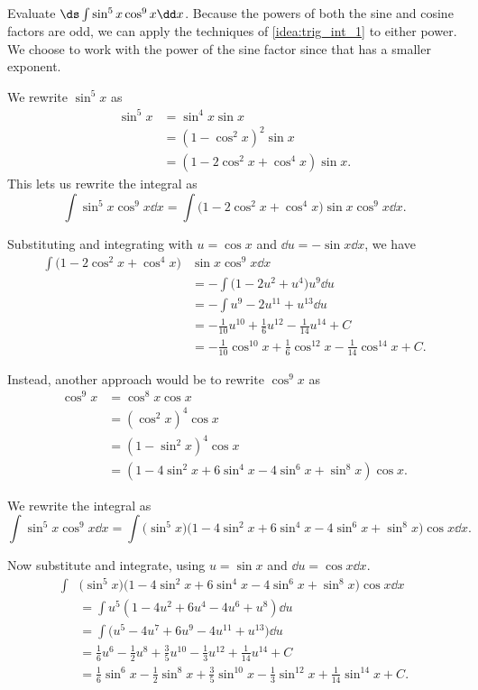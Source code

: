 \begin{example}\label{ex_trigint2}
Evaluate $\ds \int\sin^5x\cos^9x\dd x$.
\solution
Because the powers of both the sine and cosine factors are odd, we can apply the techniques of \autoref{idea:trig_int_1} to either power.
We choose to work with the power of the sine factor since that has a smaller exponent.

We rewrite $\sin^5x$ as
\begin{align*}
 \sin^5x&=\sin^4x\sin x\\
 &=(1-\cos^2x)^2\sin x\\
 &=(1-2\cos^2x+\cos^4x)\sin x.
\end{align*}
This lets us rewrite the integral as
\[
\int\sin^5x\cos^9x\dd x=\int\bigl(1-2\cos^2x+\cos^4x\bigr)\sin x\cos^9x\dd x.
\]

Substituting and integrating with $u=\cos x$ and $\dd u=-\sin x\dd x$, we have
\begin{align*}
\int\bigl(1-2\cos^2x+\cos^4x\bigr)&\sin x\cos^9x\dd x\\
&=-\int\bigl(1-2u^2+u^4\bigr)u^9\dd u\\
&=-\int u^9-2u^{11}+u^{13}\dd u\\
&=-\frac1{10}u^{10}+\frac16u^{12}-\frac1{14}u^{14}+C\\
&=-\frac1{10}\cos^{10}x+\frac16\cos^{12}x-\frac1{14}\cos^{14}x+C.
\end{align*}

Instead, another approach would be to rewrite $\cos^9x$ as
\begin{align*} \cos^9 x &= \cos^8x\cos x \\
				&= (\cos^2x)^4\cos x \\
				&= (1-\sin^2x)^4\cos x \\
				&= (1-4\sin^2x+6\sin^4x-4\sin^6x+\sin^8x)\cos x.
\end{align*}

We rewrite the integral as 
\[\int\sin^5x\cos^9x\dd x = \int\bigl(\sin^5x\bigr)\bigl(1-4\sin^2x+6\sin^4x-4\sin^6x+\sin^8x\bigr)\cos x\dd x.\]

Now substitute and integrate, using $u = \sin x $ and $\dd u = \cos x\dd x$.
\begin{align*}
 \int & \bigl(\sin^5x\bigr)\bigl(1-4\sin^2x+6\sin^4x-4\sin^6x+\sin^8x\bigr)\cos x\dd x \\
 &=\int u^5(1-4u^2+6u^4-4u^6+u^8)\dd u \\
 &= \int\bigl(u^5-4u^7+6u^9-4u^{11}+u^{13}\bigr)\dd u \\
 &= \frac16u^6-\frac12u^8+\frac35u^{10}-\frac13u^{12}+\frac{1}{14}u^{14}+C\\
 &= \frac16\sin^6 x-\frac12\sin^8 x+\frac35\sin^{10} x-\frac13\sin^{12} x+\frac{1}{14}\sin^{14} x+C.
\end{align*}
%
\end{example}

